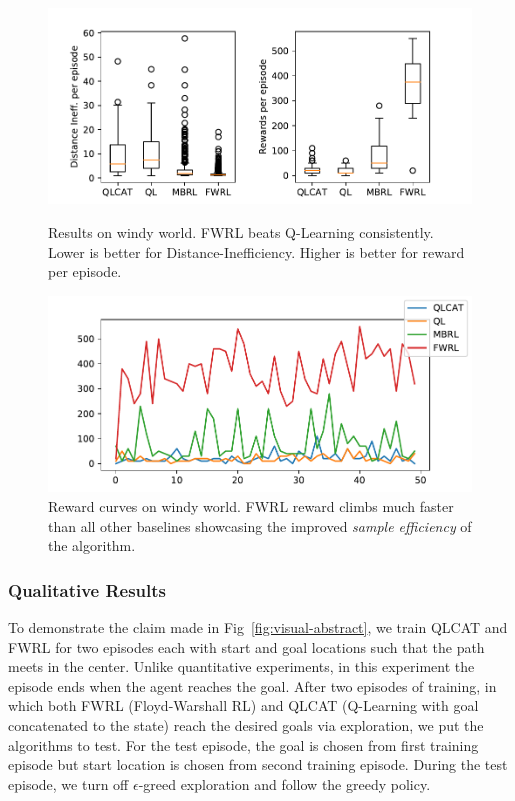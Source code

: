 \begin{figure}
    \begin{minipage}{\columnwidth}
        \includegraphics[width=\columnwidth]{./media/metrics-windy-world.pdf}
        \caption{Results on windy world. FWRL beats Q-Learning
        consistently. Lower is better for Distance-Inefficiency. Higher
        is better for reward per episode. }
      \label{fig:ql-fw-windy-world-results}%
    \end{minipage}
    \begin{minipage}{\columnwidth}
        \includegraphics[width=\columnwidth]{./media/rewards-metrics-windy-world.pdf}
        \caption{Reward curves on windy world. FWRL reward climbs much
        faster than all other baselines showcasing the improved \emph{sample
        efficiency} of the algorithm.}
    \label{fig:ql-fw-windy-world-reward-curves}%
    \end{minipage}
\end{figure}


\subsubsection{Qualitative Results}
To demonstrate the claim made in Fig~\ref{fig:visual-abstract}, we train QLCAT
and FWRL for two episodes each with start and goal locations such that the path
meets in the center. Unlike quantitative experiments, in this experiment the
episode ends when the agent reaches the goal.
After two episodes of training, in which both FWRL (Floyd-Warshall RL) and QLCAT
(Q-Learning with goal concatenated to the state) reach the desired
goals via exploration, we put the algorithms to test.
For the test episode, the goal is chosen from first training episode but start
location is chosen from second training episode.
During the test episode,
we turn off $\epsilon$-greed exploration and follow the greedy policy.

